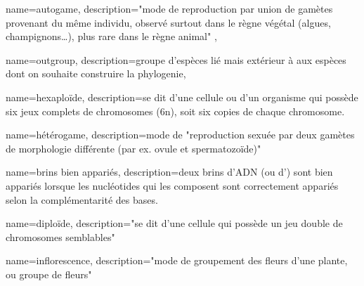 






 {
    name={autogame},
    description={"mode de reproduction par union de gamètes provenant du même individu, observé surtout dans le règne végétal (algues, champignons…), plus rare dans le règne animal" \cite{Robert}},
}

 {
    name={outgroup},
    description={groupe d'espèces lié mais extérieur à aux espèces dont on souhaite construire la \gls{phylogenie}},
}

% 
 {
    name={hexaploïde},
    description={se dit d'une cellule ou d'un organisme qui possède six jeux complets de chromosomes (6n), soit six copies de chaque chromosome.}
}
 
 {
    name={hétérogame},
    description={mode de "reproduction sexuée par deux gamètes de morphologie différente (par ex. ovule et spermatozoïde)" \cite{Robert}}
}

 {
    name={brins bien appariés},
    description={deux brins d'ADN (ou d'\ARN) sont bien appariés lorsque les \glspl{nucléotide} qui les composent sont correctement appariés selon la complémentarité des bases.}
}

 {
    name=diploïde,
    description={"se dit d'une cellule qui possède un jeu double de chromosomes semblables" \cite{Robert}}
}

 {
    name=inflorescence,
    description={"mode de groupement des fleurs d'une plante, ou groupe de fleurs" \cite{LeDico}}
}


